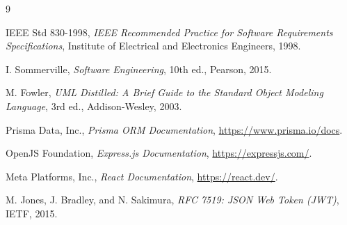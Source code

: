 \documentclass[12pt,a4paper]{report}
\begin{document}
\begin{thebibliography}{9}

IEEE Std 830-1998, \emph{IEEE Recommended Practice for Software Requirements Specifications}, Institute of Electrical and Electronics Engineers, 1998.

I. Sommerville, \emph{Software Engineering}, 10th ed., Pearson, 2015.

M. Fowler, \emph{UML Distilled: A Brief Guide to the Standard Object Modeling Language}, 3rd ed., Addison-Wesley, 2003.

Prisma Data, Inc., \emph{Prisma ORM Documentation}, \url{https://www.prisma.io/docs}.

OpenJS Foundation, \emph{Express.js Documentation}, \url{https://expressjs.com/}.

Meta Platforms, Inc., \emph{React Documentation}, \url{https://react.dev/}.

M. Jones, J. Bradley, and N. Sakimura, \emph{RFC 7519: JSON Web Token (JWT)}, IETF, 2015.

\end{thebibliography}
\end{document}
